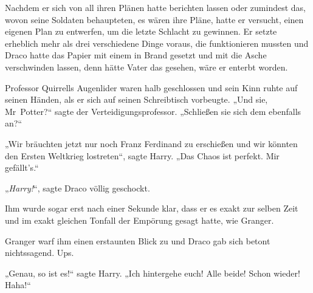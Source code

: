 Nachdem er sich von all ihren Plänen hatte berichten lassen oder zumindest das, wovon seine Soldaten behaupteten, es wären ihre Pläne, hatte er versucht, einen eigenen Plan zu entwerfen, um die letzte Schlacht zu gewinnen. Er setzte erheblich mehr als drei verschiedene Dinge voraus, die funktionieren mussten und Draco hatte das Papier mit einem  in Brand gesetzt und mit  die Asche verschwinden lassen, denn hätte Vater das gesehen, wäre er enterbt worden.

Professor Quirrells Augenlider waren halb geschlossen und sein Kinn ruhte auf seinen Händen, als er sich auf seinen Schreibtisch vorbeugte.
„Und sie, Mr~Potter?“ sagte der Verteidigungsprofessor.
„Schließen sie sich dem ebenfalls an?“

„Wir bräuchten jetzt nur noch Franz Ferdinand zu erschießen und wir könnten den Ersten Weltkrieg lostreten“, sagte Harry.
„Das Chaos ist perfekt. Mir gefällt’s.“

„\emph{Harry!}“, sagte Draco völlig geschockt.

Ihm wurde sogar erst nach einer Sekunde klar, dass er es exakt zur selben Zeit und im exakt gleichen Tonfall der Empörung gesagt hatte, wie Granger.

Granger warf ihm einen erstaunten Blick zu und Draco gab sich betont nichtssagend. Ups.

„Genau, so ist es!“ sagte Harry.
„Ich hintergehe euch! Alle beide! Schon wieder! Haha!“


